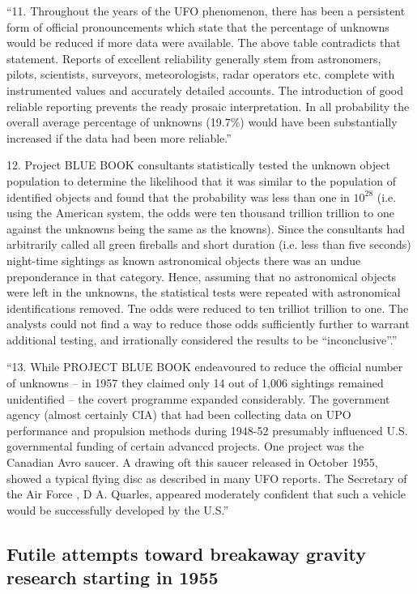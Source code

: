 \begin{svgraybox}
 ``11. Throughout the years of the UFO phenomenon, there has been
a persistent form of official pronouncements which state that the
percentage of unknowns would be reduced if more data were available.
The above table contradicts that statement. Reports of excellent
reliability generally stem from astronomers, pilots, scientists,
surveyors, meteorologists, radar operators etc. complete with
instrumented values and accurately detailed accounts. The
introduction of good reliable reporting prevents the ready prosaic
interpretation. In all probability the overall average percentage
of unknowns (19.7{\%}) would have been substantially increased if the
data had been more reliable.''

12. Project BLUE BOOK consultants statistically tested the
unknown object population to determine the likelihood that it was
similar to the population of identified objects and found that the
probability was less than one in $10^{28}$ (i.e. using the American
system, the odds were ten thousand trillion trillion to one
against the unknowns being the same as the knowns). Since the
consultants had arbitrarily called all green fireballs and short
duration (i.e. less than five seconds) night-time sightings as
known astronomical objects there was an undue preponderance in
that category. Hence, assuming that no astronomical objects were
left in the unknowns, the statistical tests were repeated with
astronomical identifications removed. Tne odds were reduced to
ten trilliot trillion to one. The analysts could not find a way
to reduce those odds sufficiently further to warrant additional
testing, and irrationally considered the results to be ``inconclusive''.''

``13. While PROJECT BLUE BOOK endeavoured to reduce the official
number of unknowns -- in 1957 they claimed only 14 out of 1,006
sightings remained unidentified -- the covert programme expanded
considerably. The government agency (almost certainly CIA) that
had been collecting data on UPO performance and propulsion methods
during 1948-52 presumably influenced U.S. governmental funding of
certain advanccd projects. One project was the Canadian Avro saucer.
A drawing oft this saucer released in October 1955, showed a typical
flying disc as described in many UFO reports. The Secretary of the
Air Force , D A. Quarles, appeared moderately confident that such
a vehicle would be successfully developed by the U.S.''
\end{svgraybox}


\subsection{Futile attempts toward breakaway gravity research starting in 1955}
\label{2023-UFO-part-Perception-types-USA-bapbbera}

